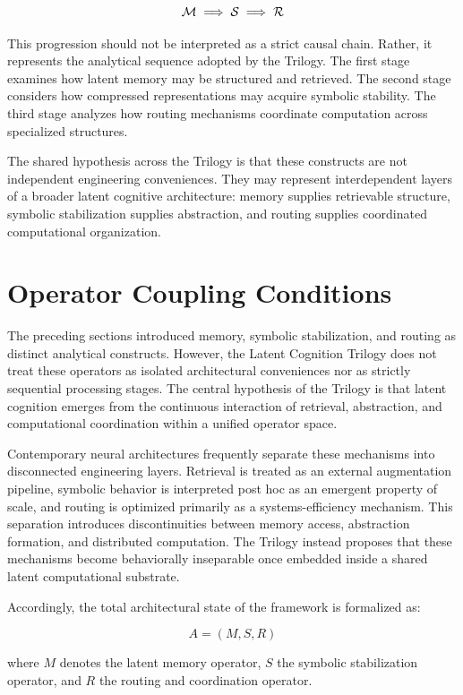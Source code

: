\[
\mathcal{M} \;\Longrightarrow\; \mathcal{S} \;\Longrightarrow\; \mathcal{R}
\]

This progression should not be interpreted as a strict causal chain. Rather, it represents the analytical sequence adopted by the Trilogy. The first stage examines how latent memory may be structured and retrieved. The second stage considers how compressed representations may acquire symbolic stability. The third stage analyzes how routing mechanisms coordinate computation across specialized structures.

The shared hypothesis across the Trilogy is that these constructs are not independent engineering conveniences. They may represent interdependent layers of a broader latent cognitive architecture: memory supplies retrievable structure, symbolic stabilization supplies abstraction, and routing supplies coordinated computational organization.

\section*{Operator Coupling Conditions}
The preceding sections introduced memory, symbolic stabilization, and routing as distinct analytical constructs. However, the Latent Cognition Trilogy does not treat these operators as isolated architectural conveniences nor as strictly sequential processing stages. The central hypothesis of the Trilogy is that latent cognition emerges from the continuous interaction of retrieval, abstraction, and computational coordination within a unified operator space.

Contemporary neural architectures frequently separate these mechanisms into disconnected engineering layers. Retrieval is treated as an external augmentation pipeline, symbolic behavior is interpreted post hoc as an emergent property of scale, and routing is optimized primarily as a systems-efficiency mechanism. This separation introduces discontinuities between memory access, abstraction formation, and distributed computation. The Trilogy instead proposes that these mechanisms become behaviorally inseparable once embedded inside a shared latent computational substrate.

Accordingly, the total architectural state of the framework is formalized as:

\[
A = (M, S, R)
\]

where \(M\) denotes the latent memory operator, \(S\) the symbolic stabilization operator, and \(R\) the routing and coordination operator.

